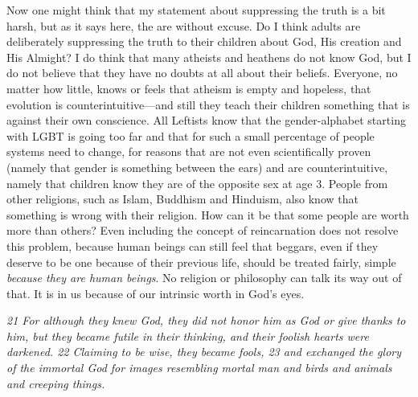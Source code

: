 Now one might think that my statement about suppressing the truth is a
bit harsh, but as it says here, the are without excuse. Do I think
adults are deliberately suppressing the truth to their children about
God, His creation and His Almight? I do think that many atheists and
heathens do not know God, but I do not believe that they have no doubts
at all about their beliefs. Everyone, no matter how little, knows or
feels that atheism is empty and hopeless, that evolution is
counterintuitive---and still they teach their children something that is
against their own conscience. All Leftists know that the gender-alphabet
starting with LGBT is going too far and that for such a small percentage
of people systems need to change, for reasons that are not even
scientifically proven (namely that gender is something between the ears)
and are counterintuitive, namely that children know they are of the
opposite sex at age 3. People from other religions, such as Islam,
Buddhism and Hinduism, also know that something is wrong with their
religion. How can it be that some people are worth more than others?
Even including the concept of reincarnation does not resolve this
problem, because human beings can still feel that beggars, even if they
deserve to be one because of their previous life, should be treated
fairly, simple \emph{because they are human beings}. No religion or
philosophy can talk its way out of that. It is in us because of our
intrinsic worth in God's eyes.

\emph{21 For although they knew God, they did not honor him as God or
give thanks to him, but they became futile in their thinking, and their
foolish hearts were darkened. 22 Claiming to be wise, they became fools,
23 and exchanged the glory of the immortal God for images resembling
mortal man and birds and animals and creeping things.}

